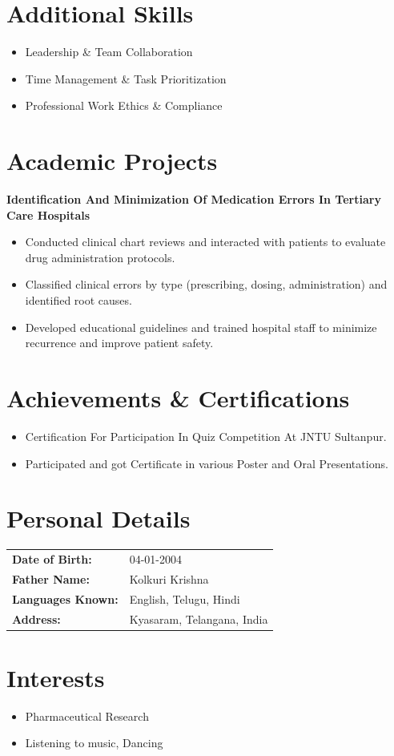 \documentclass[10pt,a4paper]{article}
\begin{document}
\section*{Additional Skills}
\begin{itemize}
    \item Leadership \& Team Collaboration
    \item Time Management \& Task Prioritization
    \item Professional Work Ethics \& Compliance
\end{itemize}

\section*{Academic Projects}
\vspace{2pt}
\textbf{Identification And Minimization Of Medication Errors In Tertiary Care Hospitals}
\begin{itemize}
    \item Conducted clinical chart reviews and interacted with patients to evaluate drug administration protocols.
    \item Classified clinical errors by type (prescribing, dosing, administration) and identified root causes.
    \item Developed educational guidelines and trained hospital staff to minimize recurrence and improve patient safety.
\end{itemize}

\section*{Achievements \& Certifications}
\begin{itemize}
    \item Certification For Participation In Quiz Competition At JNTU Sultanpur.
    \item Participated and got Certificate in various Poster and Oral Presentations.
\end{itemize}

\section*{Personal Details}
\vspace{2pt}
\begin{tabular}{@{}ll}
    \textbf{Date of Birth:} & 04-01-2004 \\
    \textbf{Father Name:} & Kolkuri Krishna \\
    \textbf{Languages Known:} & English, Telugu, Hindi \\
    \textbf{Address:} & Kyasaram, Telangana, India \\
\end{tabular}

\section*{Interests}
\begin{itemize}
    \item Pharmaceutical Research
    \item Listening to music, Dancing
\end{itemize}
\end{document}
